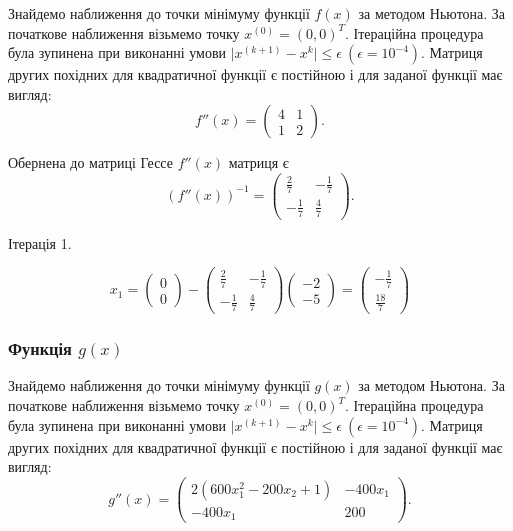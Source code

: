 \documentclass[14pt,a4paper]{extarticle}
\theoremstyle{definition}
\renewcommand{\[}{\begin{dmath*}[compact]}
\renewcommand{\]}{\end{dmath*}}
\begin{document}
Знайдемо наближення до точки мінімуму функції $f(x)$ за методом Ньютона.
За початкове наближення візьмемо точку $x^{(0)}=(0,0)^T$.
Ітераційна процедура була зупинена при виконанні умови $\vert x^{(k+1)} - x^{k}\vert \leq \epsilon \ (\epsilon = 10^{-4})$.
Матриця других похідних для квадратичної функції є постійною і для заданої функції має вигляд:
\[f''(x)=\left(\begin{matrix}4 & 1\\1 & 2\end{matrix}\right).\]

Обернена до матриці Гессе $f''(x)$ матриця є
\[(f''(x))^{-1}=\left(\begin{matrix}\frac{2}{7} & - \frac{1}{7}\\- \frac{1}{7} & \frac{4}{7}\end{matrix}\right).\]

Ітерація 1.

\[x_{1} = \left(\begin{matrix}0\\0\end{matrix}\right) - \left(\begin{matrix}\frac{2}{7} & - \frac{1}{7}\\- \frac{1}{7} & \frac{4}{7}\end{matrix}\right) \left(\begin{matrix}-2\\-5\end{matrix}\right) = \left(\begin{matrix}- \frac{1}{7}\\\frac{18}{7}\end{matrix}\right)\]

\subsubsection{Функція $g(x)$}

Знайдемо наближення до точки мінімуму функції $g(x)$ за методом Ньютона.
За початкове наближення візьмемо точку $x^{(0)}=(0,0)^T$.
Ітераційна процедура була зупинена при виконанні умови $\vert x^{(k+1)} - x^{k}\vert \leq \epsilon \ (\epsilon = 10^{-4})$.
Матриця других похідних для квадратичної функції є постійною і для заданої функції має вигляд:
\[g''(x)=\left(\begin{matrix}2 \left(600 x_{1}^{2} - 200 x_{2} + 1\right) & - 400 x_{1}\\- 400 x_{1} & 200\end{matrix}\right).\]
\end{document}
